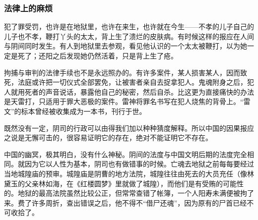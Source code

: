 \subsubsection*{法律上的麻烦}
\par 犯了罪受罚，也许是在地狱里，也许在来生，也许就在今生——不孝的儿子自己的儿子也不孝，鞭打丫头的太太，背上生了溃烂的皮肤病。有时候这样的报应在人间与阴间同时发生。有人到地狱里去参观，看见他认识的一个太太被鞭打，以为她一定是死了；还阳之后发现她仍然活着，只是背上生了疮。
\par 拘捕与审判的法律手续也不是永远照办的。有许多案件，某人损害某人，因而致死，法庭或许把一切仪式全部罢免，让被害者亲自去捉拿犯人。鬼魂附身之后，犯人就用死者的声音说话，暴露他自己的秘密，然后自杀。比这更为直接痛快的办法是天雷打，只适用于罪大恶极的案件。雷神将罪名书写在犯人烧焦的背骨上。“雷文”的标本曾经被收集成为一本书，刊行于世。
\par 既然没有一定，阴司的行政可以由得我们加以种种猜度解释。所以中国的因果报应之说是无懈可击的，很容易证明它的存在，绝对不能证明它不存在。
\par 中国的幽冥，极其明白，没有什么神秘。阴间的法度与中国文明后期的法度完全相同。就因为它以人性为基本，阴司也有做错事的时候。亡魂去地狱之前每每要经过当地城隍庙的预审。城隍庙是阴曹的地方法院，城隍往往由死去的大员充任（像林黛玉的父亲林如海，在《红楼圆梦》里就做了城隍），而他们是有受贿的可能性的。地狱的最高法院虽然比较公正，但常常查错了帐簿，一个人阳寿未满便被拘了来。费了许多周折，查出错误之后，他不得不“借尸还魂”，因为原有的尸首已经不可收拾了。
